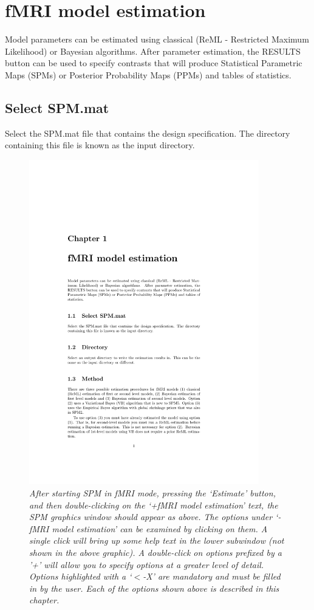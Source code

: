 \documentclass[a4paper,titlepage]{book}
\begin{document}
\chapter{fMRI model estimation}

Model parameters can be estimated using classical (ReML - Restricted Maximum Likelihood) or Bayesian algorithms. After parameter estimation, the RESULTS button can be used to specify contrasts that will produce Statistical Parametric Maps (SPMs) or Posterior Probability Maps (PPMs) and tables of statistics.


\section{Select SPM.mat}
Select the SPM.mat file that contains the design specification. 
The directory containing this file is known as the input directory.

\begin{figure}
\includegraphics[width=100mm]{fmri_est}
\caption{\em After starting SPM in fMRI mode, pressing the `Estimate' button, and then double-clicking on the `+fMRI model estimation' text, the SPM graphics window should appear as above. The options under `-fMRI model estimation' can be examined by clicking on them. A single click will bring up some help text in the lower subwindow (not shown in the above graphic). 
A double-click on options prefixed by a '+' will allow you to specify 
options at a greater level of detail. Options highlighted with a `$<$-X' are mandatory and must be filled in by the user. Each of the options shown above is described in this chapter. \label{est}}
\end{figure}
\end{document}
